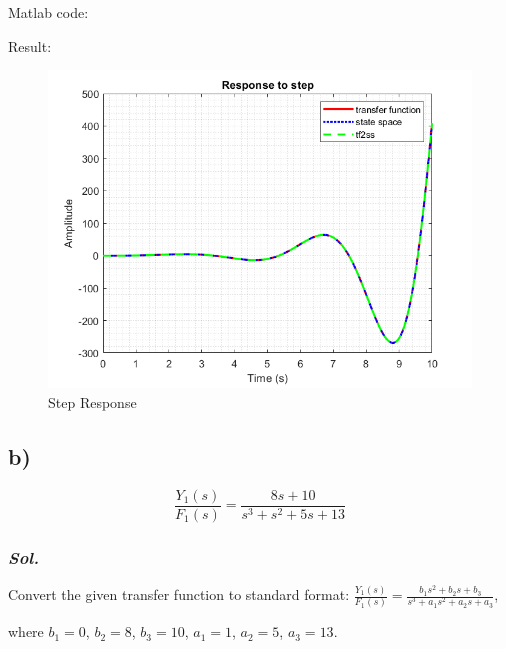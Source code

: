Matlab code:
    
Result:
\begin{figure}[htp]
    \centering
    \includegraphics[width=12cm]{images/Q5_a_fig.png}
    \caption{Step Response}
    \label{fig:Q5a1}
\end{figure}


\subsection{b)}
\begin{equation}
    \frac{Y_1(s)}{F_1(s)} = \frac{8s+10}{s^3+s^2+5s+13}
\end{equation}

\subsubsection{\textit{ Sol. }}
Convert the given transfer function to standard format:
$\frac{Y_1(s)}{F_1(s)} = \frac{b_1s^2+b_2s+b_3}{s^3+a_1s^2+a_2s+a_3}$, 

where $b_1 =0$, $b_2=8$, $b_3 = 10$, $a_1 = 1$, $a_2 = 5$, $a_3 = 13$.

